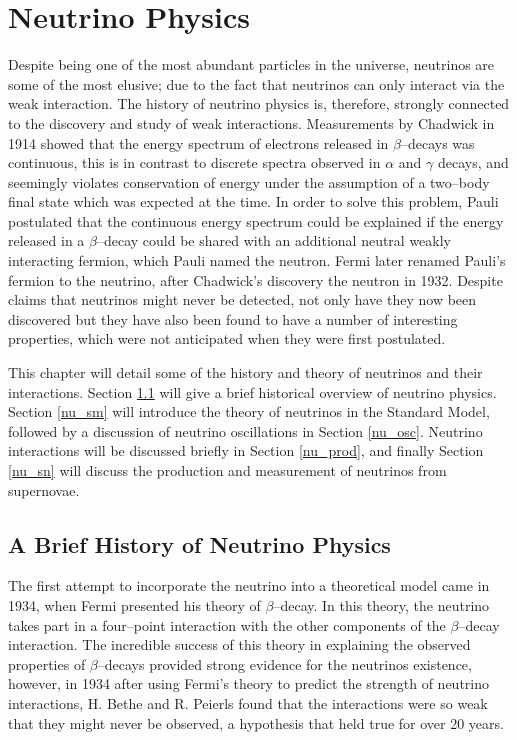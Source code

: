 \chapter{\label{ch:neutrinophysics}Neutrino Physics} 

\minitoc

Despite being one of the most abundant particles in the universe, neutrinos are 
some of the most elusive; due to the fact that neutrinos can only interact via
the weak interaction. The history of neutrino physics is, therefore, strongly
connected to the discovery and study of weak interactions. Measurements by
Chadwick in 1914 showed that the energy spectrum of electrons released in
$\beta$--decays was continuous\cite{chadwick1914intensitatsverteilung}, this 
is in contrast to discrete spectra observed in $\alpha$ and $\gamma$ decays, 
and seemingly violates conservation of energy under the assumption of a 
two--body final state which was expected at the time. In order to solve this 
problem, Pauli postulated that the continuous energy spectrum could be 
explained if the energy released in a $\beta$--decay could be shared with an 
additional neutral weakly interacting fermion\cite{Pauli:83282}, which Pauli 
named the neutron.  Fermi later renamed Pauli's fermion to the neutrino, after 
Chadwick's discovery the neutron in 1932. Despite claims that neutrinos might 
never be detected, not only have they now been discovered but they have also 
been found to have a number of interesting properties, which were not 
anticipated when they were first postulated. 

This chapter will detail some of the history and theory of neutrinos and their 
interactions. Section \ref{nu_hist} will give a brief historical overview of 
neutrino physics. Section \ref{nu_sm} will introduce the theory of neutrinos 
in the Standard Model, followed by a discussion of neutrino oscillations in 
Section \ref{nu_osc}. Neutrino interactions will be discussed briefly in 
Section \ref{nu_prod}, and finally Section \ref{nu_sn} will discuss the 
production and measurement of neutrinos from supernovae.

\section{A Brief History of Neutrino Physics} \label{nu_hist}

The first attempt to incorporate the neutrino into a theoretical model came in
1934, when Fermi presented his theory of \(\beta\)--decay. In this theory, the 
neutrino takes part in a four--point interaction with the other components of 
the \(\beta\)--decay interaction\cite{Fermi1934}. The incredible success of 
this theory in explaining the observed properties of \(\beta\)--decays 
provided strong evidence for the neutrinos existence, however, in 1934 after 
using Fermi's theory to predict the strength of neutrino interactions, H. 
Bethe and R. Peierls found that the interactions were so weak that they might 
never be observed, a hypothesis that held true for over 20 
years\cite{Bethe1934}.

